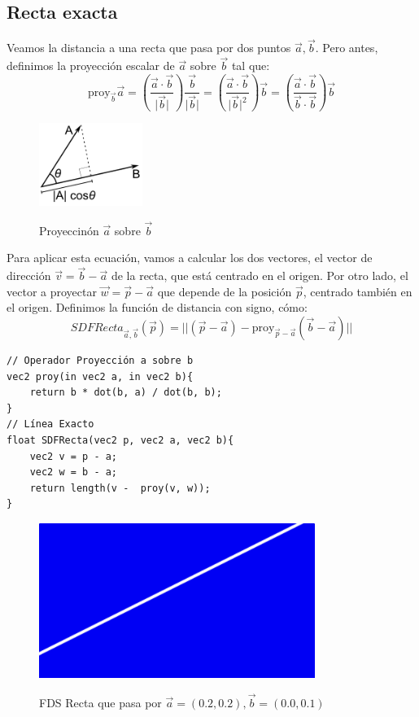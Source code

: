 \subsection{Recta exacta}
Veamos la distancia a una recta que pasa por dos puntos \(\Vec{a},\Vec{b}\). Pero antes, definimos la proyección escalar de \(\Vec{a}\) sobre \(\Vec{b}\) tal que:
\[ \text{proy}_{\Vec{b}}\Vec{a}=\left(\dfrac{\Vec{a}\cdot\Vec{b}}{\vert \Vec{b}\vert}\right)\dfrac{\Vec{b}}{\vert\Vec{b}\vert}=\left(\dfrac{\Vec{a}\cdot\Vec{b}}{\vert \Vec{b}\vert^2}\right)\Vec{b}=\left(\dfrac{\Vec{a}\cdot \Vec{b}}{\Vec{b}\cdot \Vec{b}}\right)\Vec{b}\]

\begin{figure}[H]
  \centering
  \captionsetup{justification=centering}%
  \includegraphics[width=0.3\textwidth]{secciones/imagenes/proyeccion.png}\label{fig:proyection}
  \caption{Proyeccinón \(\Vec{a}\) sobre \(\Vec{b}\)}
\end{figure}
Para aplicar esta ecuación, vamos a calcular los dos vectores, el vector de dirección \(\Vec{v}=\Vec{b}-\Vec{a}\) de la recta, que está centrado en el origen. Por otro lado, el vector a proyectar \(\Vec{w}=\Vec{p}-\Vec{a}\) que depende de la posición \(\Vec{p}\), centrado también en el origen. Definimos la función de distancia con signo, cómo:
\[SDFRecta_{\Vec{a},\Vec{b}}(\Vec{p})=\vert\vert (\Vec{p}-\Vec{a}) - \text{proy}_{\Vec{p}-\Vec{a}}\left(\Vec{b}-\Vec{a}\right)\vert\vert\]

\begin{lstlisting}
// Operador Proyección a sobre b
vec2 proy(in vec2 a, in vec2 b){
    return b * dot(b, a) / dot(b, b);
}
// Línea Exacto
float SDFRecta(vec2 p, vec2 a, vec2 b){
    vec2 v = p - a;
    vec2 w = b - a;
    return length(v -  proy(v, w));
}
\end{lstlisting}
\begin{figure}[H]
  \centering
  \captionsetup{justification=centering}%
  \includegraphics[width=0.8\textwidth]{secciones/imagenes/sdf_recta.jpeg}\label{fig:recta}
  \caption{FDS Recta que pasa por \(\Vec{a}=(0.2, 0.2), \Vec{b}=(0.0, 0.1)\)}
\end{figure}

